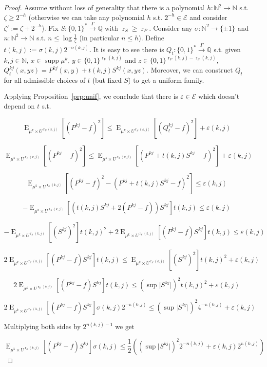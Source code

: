 \documentclass{article}
\numberwithin{equation}{section}
\theoremstyle{definition}
\theoremstyle{plain}
\newcommand{\Words}{{\{ 0, 1 \}^*}}
\newcommand{\WordsLen}[1]{{\{ 0, 1 \}^{#1}}}
\DeclareMathOperator{\Supp}{supp}
\DeclareMathOperator{\E}{E}
\DeclareMathOperator{\R}{r}
\newcommand{\Nats}{\mathbb{N}}
\newcommand{\Rats}{\mathbb{Q}}
\newcommand{\Abs}[1]{\lvert #1 \rvert}
\begin{document}
\begin{proof}

Assume without loss of generality that there is a polynomial ${h: \Nats^2 \rightarrow \Nats}$ s.t. $\zeta \geq 2^{-h}$ (otherwise we can take any polynomial $h$ s.t. $2^{-h} \in \mathcal{E}$ and consider $\zeta':=\zeta+2^{-h}$). Fix $S: \Words \xrightarrow{\Gamma} \Rats$ with $\R_S \geq \R_P$. Consider any ${\sigma: \Nats^2 \rightarrow \{ \pm 1 \}}$ and $n: \Nats^2 \rightarrow \Nats$ s.t. $n \leq \log \frac{1}{\zeta}$ (in particular $n \leq h$). Define ${t(k,j) := \sigma(k,j) 2^{-n(k,j)}}$. It is easy to see there is $Q_t: \Words \xrightarrow{\Gamma} \Rats$ s.t. given $k,j \in \Nats$, $x \in \Supp \mu^k$, ${y \in \WordsLen{\R_P(k,j)}}$ and $z \in \WordsLen{\R_P(k,j) - \R_S(k,j)}$, $Q_t^{kj}(x,yz) = P^{kj}(x,y) + t(k,j) S^{kj}(x,yz)$. Moreover, we can construct $Q_t$ for all admissible choices of $t$ (but fixed $S$) to get a uniform family.

Applying Proposition~\ref{prp:unif}, we conclude that there is $\varepsilon \in \mathcal{E}$ which doesn't depend on $t$ s.t.

$$\E_{\mu^k \times U^{\R_P(k,j)}}[(P^{kj} - f)^2] \leq \E_{\mu^k \times U^{\R_S(k,j)}}[(Q_t^{kj} - f)^2] + \varepsilon(k,j)$$

$$\E_{\mu^k \times U^{\R_P(k,j)}}[(P^{kj} - f)^2] \leq \E_{\mu^k \times U^{\R_S(k,j)}}[(P^{kj} + t(k,j)S^{kj}  - f)^2] + \varepsilon(k,j)$$

$$\E_{\mu^k \times U^{\R_S(k,j)}}[(P^{kj} - f)^2 - (P^{kj} + t(k,j)S^{kj} - f)^2] \leq \varepsilon(k,j)$$

$$-\E_{\mu^k \times U^{\R_S(k,j)}}[(t(k,j)S^{kj} + 2 (P^{kj} - f)) S^{kj}] t(k,j) \leq \varepsilon(k,j)$$

$$-\E_{\mu^k \times U^{\R_S(k,j)}}[(S^{kj})^2] t(k,j)^2 + 2 \E_{\mu^k \times U^{\R_S(k,j)}}[(P^{kj} - f) S^{kj}] t(k,j) \leq \varepsilon(k,j)$$

$$2 \E_{\mu^k \times U^{\R_S(k,j)}}[(P^{kj} - f) S^{kj}] t(k,j) \leq \E_{\mu^k \times U^{\R_S(k,j)}}[(S^{kj})^2] t(k,j)^2 + \varepsilon(k,j)$$

$$2 \E_{\mu^k \times U^{\R_S(k,j)}}[(P^{kj} - f) S^{kj}] t(k,j) \leq (\sup \Abs{S^{kj}})^2 t(k,j)^2 + \varepsilon(k,j)$$

$$2 \E_{\mu^k \times U^{\R_S(k,j)}}[(P^{kj} - f) S^{kj}] \sigma(k,j) 2^{-n(k,j)} \leq (\sup \Abs{S^{kj}})^2 4^{-n(k,j)} + \varepsilon(k,j)$$

Multiplying both sides by $2^{n(k,j)-1}$ we get

$$\E_{\mu^k \times U^{\R_S(k,j)}}[(P^{kj} - f) S^{kj}] \sigma(k,j) \leq \frac{1}{2}((\sup \Abs{S^{kj}})^2 2^{-n(k,j)} + \varepsilon(k,j) 2^{n(k,j)})$$


\end{proof}
\end{document}
